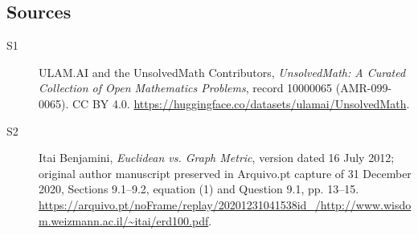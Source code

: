 \documentclass[11pt]{article}
\begin{document}
\subsection{Sources}
\begin{description}
\item[\hypertarget{source:10000065:1}{S1}] ULAM.AI and the UnsolvedMath Contributors, \emph{UnsolvedMath: A Curated Collection of Open Mathematics Problems}, record 10000065 (AMR-099-0065). CC BY 4.0. \url{https://huggingface.co/datasets/ulamai/UnsolvedMath}.
\item[\hypertarget{source:10000065:2}{S2}] Itai Benjamini, \emph{Euclidean vs. Graph Metric}, version dated 16 July 2012; original author manuscript preserved in Arquivo.pt capture of 31 December 2020, Sections 9.1--9.2, equation (1) and Question 9.1, pp. 13--15. \url{https://arquivo.pt/noFrame/replay/20201231041538id_/http://www.wisdom.weizmann.ac.il/~itai/erd100.pdf}.
\end{description}
\label{end:10000065}
\end{document}
